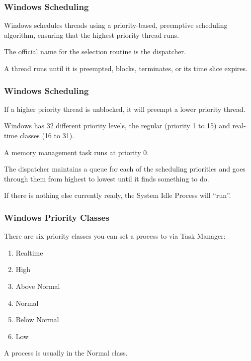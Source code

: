 \begin{frame}
\frametitle{Windows Scheduling}

Windows schedules threads using a priority-based, preemptive scheduling algorithm, ensuring that the highest priority thread runs. 

The official name for the selection routine is the \alert{dispatcher}.

A thread runs until it is preempted, blocks, terminates, or its time slice expires. 

\end{frame}

\begin{frame}
\frametitle{Windows Scheduling}

If a higher priority thread is unblocked, it will preempt a lower priority thread. 

Windows has 32 different priority levels, the regular (priority 1 to 15) and real-time classes (16 to 31). 

A memory management task runs at priority 0.

The dispatcher maintains a queue for each of the scheduling priorities and goes through them from highest to lowest until it finds something to do.

If there is nothing else currently ready, the System Idle Process will ``run''.

\end{frame}

\begin{frame}
\frametitle{Windows Priority Classes}

There are six priority classes you can set a process to via Task Manager:

\begin{enumerate}
	\item Realtime
	\item High
	\item Above Normal
	\item Normal
	\item Below Normal
	\item Low
\end{enumerate}

A process is usually in the Normal class.

\end{frame}

